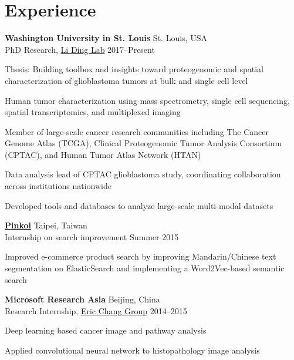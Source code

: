 \section{Experience}

\begin{outerlist}

	\item \textbf{Washington University in St. Louis} \hfill St. Louis, USA\\
	PhD Research, \href{https://dinglab.wustl.edu/}{Li Ding Lab} \hfill
	2017--Present
	\begin{innerlist}
		\item Thesis: Building toolbox and insights toward proteogenomic and spatial characterization of glioblastoma tumors at bulk and single cell level
		\item Human tumor characterization using mass spectrometry, single cell sequencing, spatial transcriptomics, and multiplexed imaging
		\item Member of large-scale cancer research communities including The Cancer Genome Atlas (TCGA), Clinical Proteogenomic Tumor Analysis Consortium (CPTAC), and Human Tumor Atlas Network (HTAN)
		\item Data analysis lead of CPTAC glioblastoma study, coordinating collaboration across institutions nationwide
		\item Developed tools and databases to analyze large-scale multi-modal datasets
	\end{innerlist}

	\item \href{http://pinkoi.com}{\textbf{Pinkoi}} \hfill Taipei, Taiwan\\
	Internship on search improvement \hfill
	Summer 2015
	\begin{innerlist}
		\item Improved e-commerce product search by improving Mandarin/Chinese text segmentation on ElasticSearch and implementing a Word2Vec-based semantic search
	\end{innerlist}

	\item \textbf{Microsoft Research Asia} \hfill Beijing, China\\
	Research Internship, \href{https://www.microsoft.com/en-us/research/people/echang/}{Eric Chang Group} \hfill
	2014--2015
	\begin{innerlist}
		\item Deep learning based cancer image and pathway analysis
		\item Applied convolutional neural network to histopathology image analysis
	\end{innerlist}


\end{outerlist}
